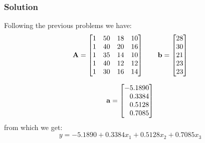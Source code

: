 \subsubsection*{Solution}
Following the previous problems we have:
\begin{equation*}
  \mathbf{A} = \begin{bmatrix}
    1 & 50 & 18 & 10 \\
    1 & 40 & 20 & 16 \\
    1 & 35 & 14 & 10 \\
    1 & 40 & 12 & 12 \\
    1 & 30 & 16 & 14
  \end{bmatrix} \qquad
  \mathbf{b} = \begin{bmatrix}
    28 \\
    30 \\
    21 \\
    23 \\
    23
  \end{bmatrix}
\end{equation*}

\begin{equation*}
  \mathbf{a} = \begin{bmatrix}
    -5.1890 \\
    \phantom{-}0.3384 \\
    \phantom{-}0.5128 \\
    \phantom{-}0.7085
  \end{bmatrix}
\end{equation*}
from which we get:
\begin{equation*}
  y= - 5.1890 + 0.3384x_1 + 0.5128x_2 + 0.7085x_3
\end{equation*}
